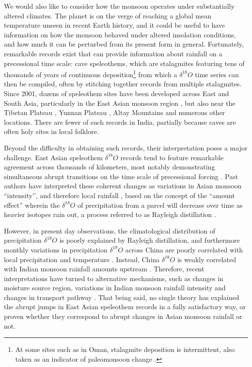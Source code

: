 	We would also like to consider how the monsoon operates under substantially altered climates. The planet is on the verge of reaching a global mean temperature unseen in recent Earth history, and it could be useful to have information on how the monsoon behaved under altered insolation conditions, and how much it can be perturbed from its present form in general. Fortunately, remarkable records exist that can provide information about rainfall on a precessional time scale: cave speleothems, which are stalagmites featuring tens of thousands of years of continuous deposition\footnote{At some sites such as in Oman, stalagmite deposition is intermittent, also taken as an indicator of paleomonsoon change \citep{Burns2001,Fleitmann2003}.} from which a $\delta ^{18}O$ time series can then be compiled, often by stitching together records from multiple stalagmites. Since 2001, dozens of speleothem sites have been developed across East and South Asia, particularly in the East Asian monsoon region \citep{Wang2001,Dykoski2005,Wang2008b}, but also near the Tibetan Plateau \citep{Cai2010b}, Yunnan Plateau \citep{Cai2015}, Altay Mountains\citep{Cheng2012} and numerous other locations. There are fewer of such records in India, partially because caves are often holy sites in local folklore.
	
	Beyond the difficulty in obtaining such records, their interpretation poses a major challenge. East Asian speleothem $\delta ^{18}O$ records tend to feature remarkable agreement across thousands of kilometers, most notably demonstrating simultaneous abrupt transitions on the time scale of precessional forcing \citep{Chiang2015}. Past authors have interpreted these coherent changes as variations in Asian monsoon ``intensity'', and therefore local rainfall \citep{Wang2001,Liu2014}, based on the concept of the ``amount effect'' wherein the $\delta ^{18}O$ of precipitation from a parcel will decrease over time as heavier isotopes rain out, a process referred to as Rayleigh distillation \citep{Dansgaard1964}. 
	
	However, in present day observations, the climatological distribution of precipitation $\delta ^{18}O$ is poorly explained by Rayleigh distillation, and furthermore monthly variations in precipitation $\delta ^{18}O$ across China are poorly correlated with local precipitation and temperature \citep{Dayem2010,Lee2012}. Instead, China $\delta ^{18}O$ is weakly correlated with Indian monsoon rainfall amounts upstream \citep{Lee2012}. Therefore, recent interpretations have turned to alternative mechanisms, such as changes in moisture source region, variations in Indian monsoon rainfall intensity and changes in transport pathway \citep{Maher2008,Dayem2010,Pausata2011,Baker2015}. That being said, no single theory has explained the abrupt jumps in East Asian speleothem records in a fully satisfactory way, or proven whether they correspond to abrupt changes in Asian monsoon rainfall or not.
	
